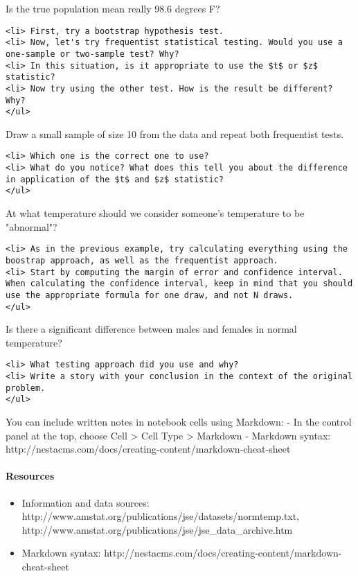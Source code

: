 \documentclass[11pt]{article}
\providecommand{\tightlist}{%
      \setlength{\itemsep}{0pt}\setlength{\parskip}{0pt}}
\begin{document}
Is the true population mean really 98.6 degrees F?

\begin{verbatim}
<li> First, try a bootstrap hypothesis test.
<li> Now, let's try frequentist statistical testing. Would you use a one-sample or two-sample test? Why?
<li> In this situation, is it appropriate to use the $t$ or $z$ statistic? 
<li> Now try using the other test. How is the result be different? Why?
</ul>
\end{verbatim}

Draw a small sample of size 10 from the data and repeat both frequentist
tests.

\begin{verbatim}
<li> Which one is the correct one to use? 
<li> What do you notice? What does this tell you about the difference in application of the $t$ and $z$ statistic?
</ul>
\end{verbatim}

At what temperature should we consider someone's temperature to be
"abnormal"?

\begin{verbatim}
<li> As in the previous example, try calculating everything using the boostrap approach, as well as the frequentist approach.
<li> Start by computing the margin of error and confidence interval. When calculating the confidence interval, keep in mind that you should use the appropriate formula for one draw, and not N draws.
</ul>
\end{verbatim}

Is there a significant difference between males and females in normal
temperature?

\begin{verbatim}
<li> What testing approach did you use and why?
<li> Write a story with your conclusion in the context of the original problem.
</ul>
\end{verbatim}

You can include written notes in notebook cells using Markdown: - In the
control panel at the top, choose Cell \textgreater{} Cell Type
\textgreater{} Markdown - Markdown syntax:
http://nestacms.com/docs/creating-content/markdown-cheat-sheet

\paragraph{Resources}\label{resources}

\begin{itemize}
\tightlist
\item
  Information and data sources:
  http://www.amstat.org/publications/jse/datasets/normtemp.txt,
  http://www.amstat.org/publications/jse/jse\_data\_archive.htm
\item
  Markdown syntax:
  http://nestacms.com/docs/creating-content/markdown-cheat-sheet
\end{itemize}
\end{document}
